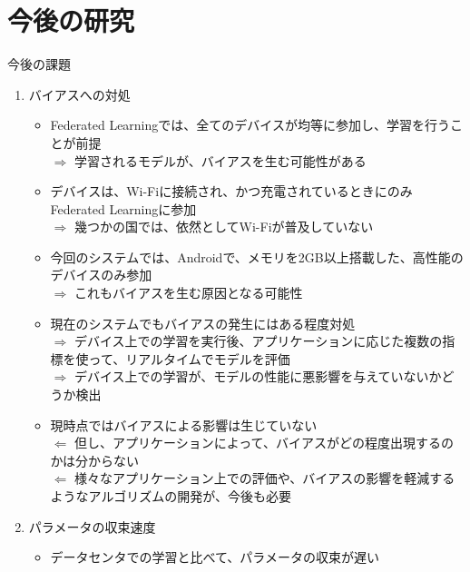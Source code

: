 \documentclass[dvipdfmx,notheorems,t]{beamer}
\begin{document}
\section{今後の研究}

\begin{frame}{今後の課題}

\begin{enumerate}
	\item バイアスへの対処
	\begin{itemize}
		\item Federated Learningでは、全てのデバイスが均等に参加し、学習を行うことが前提 \\
		$\Rightarrow$ 学習されるモデルが、バイアスを生む可能性がある
		\newline
		
		\item デバイスは、Wi-Fiに接続され、かつ充電されているときにのみFederated Learningに参加 \\
		$\Rightarrow$ 幾つかの国では、依然としてWi-Fiが普及していない
		\newline
		
		\item 今回のシステムでは、Androidで、メモリを2GB以上搭載した、高性能のデバイスのみ参加 \\
		$\Rightarrow$ これもバイアスを生む原因となる可能性
		\newline
		
		\item 現在のシステムでもバイアスの発生にはある程度対処 \\
		$\Rightarrow$ デバイス上での学習を実行後、アプリケーションに応じた複数の指標を使って、リアルタイムでモデルを評価 \\
		$\Rightarrow$ デバイス上での学習が、モデルの性能に悪影響を与えていないかどうか検出
		\newline
		
		\item 現時点ではバイアスによる影響は生じていない \\
		$\Leftarrow$ 但し、アプリケーションによって、バイアスがどの程度出現するのかは分からない \\
		$\Leftarrow$ 様々なアプリケーション上での評価や、バイアスの影響を軽減するようなアルゴリズムの開発が、今後も必要
	\end{itemize}
	
	\framebreak
	
	\item パラメータの収束速度
	\begin{itemize}
		\item データセンタでの学習と比べて、パラメータの収束が遅い
		\newline
		

\end{itemize}
\end{enumerate}
\end{frame}
\end{document}
